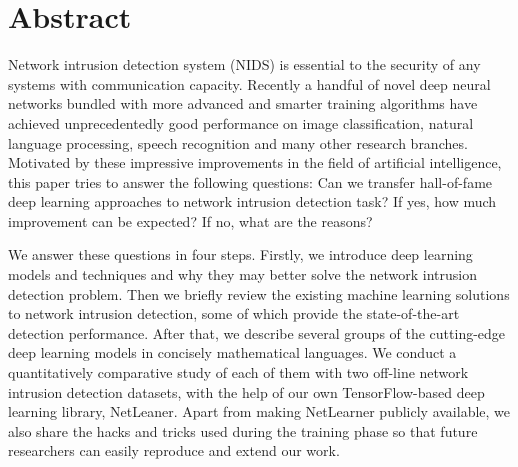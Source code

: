 \section{Abstract}
Network intrusion detection system (NIDS) is essential to the security of any systems with communication capacity.
Recently a handful of novel deep neural networks bundled with more advanced and smarter
training algorithms have achieved unprecedentedly good performance on image classification,
natural language processing, speech recognition and many other research branches.
Motivated by these impressive improvements in the field of artificial intelligence,
this paper tries to answer the following questions:
Can we transfer hall-of-fame deep learning approaches to network intrusion detection task?
If yes, how much improvement can be expected?
If no, what are the reasons?

We answer these questions in four steps.
Firstly, we introduce deep learning models and techniques and why they may better solve the
network intrusion detection problem.
Then we briefly review the existing machine learning solutions to network intrusion detection,
some of which provide the state-of-the-art detection performance.
After that, we describe several groups of the cutting-edge deep learning models
in concisely mathematical languages.
We conduct a quantitatively comparative study of each of them with two off-line network intrusion detection datasets,
with the help of our own TensorFlow-based deep learning library, NetLeaner.
Apart from making NetLearner publicly available, we also share the hacks and tricks
used during the training phase so that future researchers can easily reproduce and extend our work.
